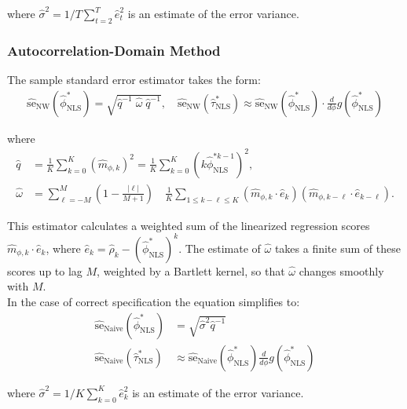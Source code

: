 \documentclass[main.tex]{subfiles}
\begin{document}
\noindent where $\hat\sigma^2 = 1/T \sum_{t=2}^T \hat e_t^2$ is an estimate of the error variance.

\subsubsection{Autocorrelation-Domain Method}\label{sec:stderr-autocorrelation-domain_}
The sample standard error estimator takes the form:
\begin{align}\label{eq:stderr-autocorrelation-domain_}
\widehat{\text{se}}_{\text{NW}}(\hat\phi^*_{\scriptscriptstyle\text{NLS}}) = \sqrt{\hat q^{-1}\;\hat\omega\; \hat q^{-1}}, \quad
\widehat{\text{se}}_{\text{NW}}(\hat\tau^*_{\scriptscriptstyle\text{NLS}}) \approx \widehat{\text{se}}_{\text{NW}}(\hat\phi^*_{\scriptscriptstyle\text{NLS}}) \cdot \frac{d}{d\phi} g(\hat\phi^*_{\scriptscriptstyle\text{NLS}})
\end{align}

\noindent where
\begin{align}
    \hat q &= \frac{1}{K} \sum_{k=0}^K (\hat m_{\phi,k})^2 = \frac{1}{K} \sum_{k=0}^K (k \hat\phi_{\scriptscriptstyle\text{NLS}}^{*k-1})^2,\\
    \hat \omega &= \sum_{\ell=-M}^M \left(1 - \frac{|\ell|}{M+1}\right) \quad \frac{1}{K} \sum_{1 \le k - \ell \le K} (\hat m_{\phi, k} \cdot \hat e_k) (\hat m_{\phi, k-\ell} \cdot \hat e_{k-\ell}).\label{eq:nls_q_omega_}
\end{align}

\noindent This estimator calculates a weighted sum of the linearized regression scores $\hat m_{\phi, k} \cdot \hat e_k$, where $\hat e_k = \hat\rho_k - (\hat\phi^*_{\scriptscriptstyle\text{NLS}})^k$. The estimate of $\hat\omega$ takes a finite sum of these scores up to lag $M$, weighted by a Bartlett kernel, so that $\hat\omega$ changes smoothly with $M$.\\

\noindent In the case of correct specification the equation simplifies to:
\begin{align}
    \widehat{\text{se}}_\text{Naive}(\hat\phi^*_{\scriptscriptstyle\text{NLS}}) &= \sqrt{\hat\sigma^2 \hat q^{-1}}\\
    \widehat{\text{se}}_\text{Naive}(\hat\tau^*_{\scriptscriptstyle\text{NLS}}) &\approx \widehat{\text{se}}_{\text{Naive}}(\hat\phi^*_{\scriptscriptstyle\text{NLS}}) \frac{d}{d\phi} g(\hat\phi^*_{\scriptscriptstyle\text{NLS}})
\end{align}

\noindent where $\hat\sigma^2 = 1/K \sum_{k=0}^K \hat e_k^2$ is an estimate of the error variance.\\
\end{document}

